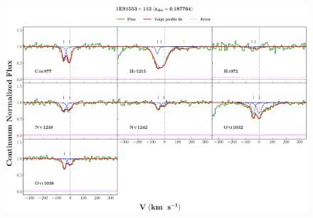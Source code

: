 \documentclass[12pt,draft]{report}
\begin{document}
\newpage

\begin{landscape}

\begin{figure}
    \centering
    \vspace{-20mm}
    \hspace*{-35mm}
    \includegraphics[width=1.25\linewidth]{System-Plots/1ES1553+113_z=0.187764_sys_plot.png}
\end{figure}

\end{landscape}
\end{document}
